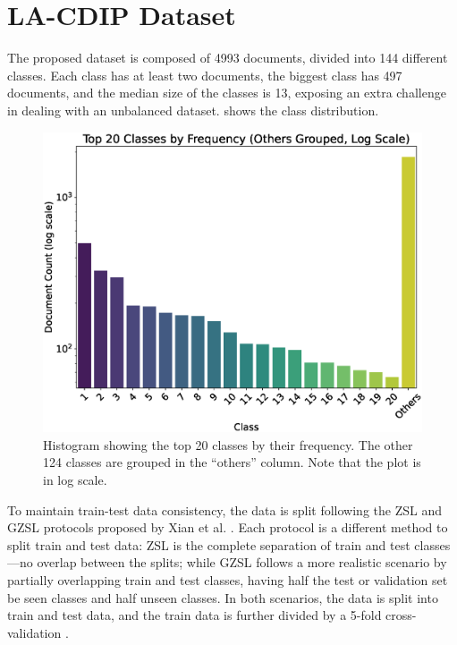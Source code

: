 \section{LA-CDIP Dataset}
\label{sec:dataset}

The proposed dataset is composed of 4993 documents, divided into 144 different classes. Each class has at least two documents, the biggest class has 497 documents, and the median size of the classes is 13, exposing an extra challenge in dealing with an unbalanced dataset.  shows the class distribution.

\begin{figure}[htbp]
\centering
\includegraphics[width=.8\textwidth]{images/hist2.eps}
\caption{Histogram showing the top 20 classes by their frequency. The other 124 classes are grouped in the ``others'' column. Note that the plot is in log scale.}
\label{fig:histplot}
\end{figure}  

To maintain train-test data consistency, the data is split following the \gls{ZSL} and \gls{GZSL} protocols proposed by Xian et al. \cite{xian_zero-shot_2019}. Each protocol is a different method to split train and test data: \gls{ZSL} is the complete separation of train and test classes—no overlap between the splits; while \gls{GZSL} follows a more realistic scenario by partially overlapping train and test classes, having half the test or validation set be seen classes and half unseen classes. In both scenarios, the data is split into train and test data, and the train data is further divided by a 5-fold cross-validation \cite{wong_reliable_2019}.

